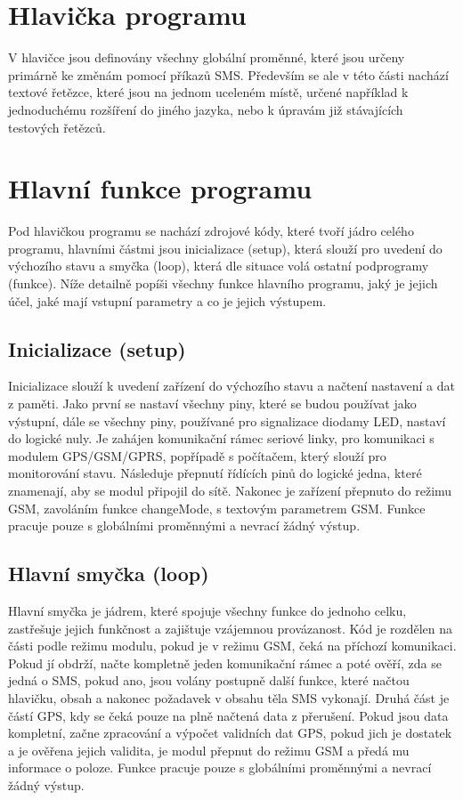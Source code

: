 \documentclass[FM,BP]{tulthesis}  %
\begin{document}

\section{Hlavička programu}
V hlavičce jsou definovány všechny globální proměnné, které jsou určeny primárně ke změnám pomocí příkazů SMS. Především se ale v této části nachází textové řetězce, které jsou na jednom uceleném místě, určené například k jednoduchému rozšíření do jiného jazyka, nebo k úpravám již stávajících testových řetězců.

\section{Hlavní funkce programu}
Pod hlavičkou programu se nachází zdrojové kódy, které tvoří jádro celého programu, hlavními částmi jsou inicializace (setup), která slouží pro uvedení do výchozího stavu a smyčka (loop), která dle situace volá ostatní podprogramy (funkce). Níže detailně popíši všechny funkce hlavního programu, jaký je jejich účel, jaké mají vstupní parametry a co je jejich výstupem.

\subsection{Inicializace (setup)}
Inicializace slouží k uvedení zařízení do výchozího stavu a načtení nastavení a dat z paměti. Jako první se nastaví všechny piny, které se budou používat jako výstupní, dále se všechny piny, používané pro signalizace diodamy LED, nastaví do logické nuly. Je zahájen komunikační rámec seriové linky, pro komunikaci s modulem GPS/GSM/GPRS, popřípadě s počítačem, který slouží pro monitorování stavu.  Následuje přepnutí řídících pinů do logické jedna, které znamenají, aby se modul připojil do sítě. Nakonec je zařízení přepnuto do režimu GSM, zavoláním funkce changeMode, s textovým parametrem GSM. Funkce pracuje pouze s globálními proměnnými a nevrací žádný výstup.

\subsection{Hlavní smyčka (loop)}
Hlavní smyčka je jádrem, které spojuje všechny funkce do jednoho celku, zastřešuje jejich funkčnost a zajištuje vzájemnou provázanost. Kód je rozdělen na části podle režimu modulu, pokud je v režimu GSM, čeká na příchozí komunikaci. Pokud jí obdrží, načte kompletně jeden komunikační rámec a poté ověří, zda se jedná o SMS, pokud ano, jsou volány postupně další funkce, které načtou hlavičku, obsah a nakonec požadavek v obsahu těla SMS vykonají. Druhá část je částí GPS, kdy se čeká pouze na plně načtená data z přerušení. Pokud jsou data kompletní, začne zpracování a výpočet validních dat GPS, pokud jich je dostatek a je ověřena jejich validita, je modul přepnut do režimu GSM a předá mu informace o poloze. Funkce pracuje pouze s globálními proměnnými a nevrací žádný výstup.
\end{document}
